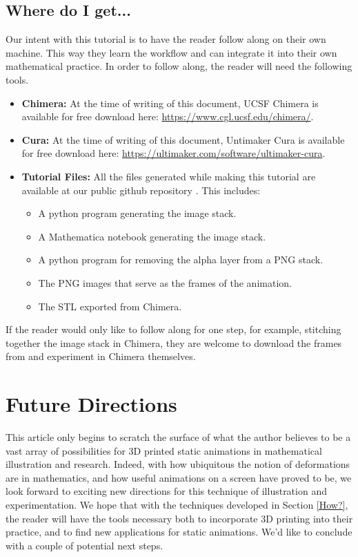 \documentclass[12 pt]{article}
\begin{document}
\subsection{Where do I get...}\label{where}
Our intent with this tutorial is to have the reader follow along on their own machine.  This way they learn the workflow and can integrate it into their own mathematical practice.  In order to follow along, the reader will need the following tools.
\begin{itemize}
    \item \textbf{Chimera:} At the time of writing of this document, UCSF Chimera \cite{chimeraSoftware} is available for free download here: \url{https://www.cgl.ucsf.edu/chimera/}.
    \item \textbf{Cura:} At the time of writing of this document, Untimaker Cura \cite{Cura} is available for free download here: \url{https://ultimaker.com/software/ultimaker-cura}.
    \item \textbf{Tutorial Files:} All the files generated while making this tutorial are available at our public github repository \cite{github}.  This includes:
    \begin{itemize}
        \item A python program generating the image stack.
        \item A Mathematica notebook generating the image stack.
        \item A python program for removing the alpha layer from a PNG stack.
        \item The PNG images that serve as the frames of the animation.
        \item The STL exported from Chimera.
    \end{itemize}
 \end{itemize}
    If the reader would only like to follow along for one step, for example, stitching together the image stack in Chimera, they are welcome to download the frames from \cite{github} and experiment in Chimera themselves.
\section{Future Directions}\label{conclusion}
This article only begins to scratch the surface of what the author believes to be a vast array of possibilities for 3D printed static animations in mathematical illustration and research. Indeed, with how ubiquitous the notion of deformations are in mathematics, and how useful animations on a screen have proved to be, we look forward to exciting new directions for this technique of illustration and experimentation.  We hope that with the techniques developed in Section \ref{How?}, the reader will have the tools necessary both to incorporate 3D printing into their practice, and to find new applications for static animations.  We'd like to conclude with a couple of potential next steps.
\end{document}
